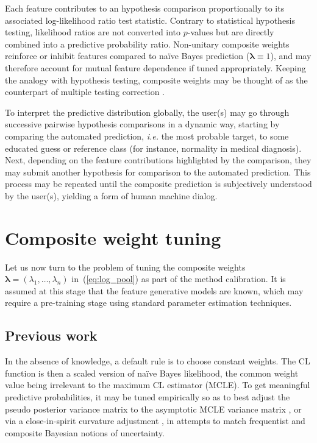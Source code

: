 \documentclass[english]{scrartcl}
\newcommand{\blambda}{{\boldsymbol{\lambda}}}
\begin{document}
Each feature contributes to an hypothesis comparison proportionally to its associated log-likelihood ratio test statistic. Contrary to statistical hypothesis testing, likelihood ratios are not converted into $p$-values but are directly combined into a predictive probability ratio. Non-unitary composite weights reinforce or inhibit features compared to na\"ive Bayes prediction ($\blambda\equiv 1$), and may therefore account for mutual feature dependence if tuned appropriately. Keeping the analogy with hypothesis testing, composite weights may be thought of as the counterpart of multiple testing correction \cite{Benjamini-10}.

To interpret the predictive distribution globally, the user(s) may go through successive pairwise hypothesis comparisons in a dynamic way, starting by comparing the automated prediction, {\em i.e.} the most probable target, to some educated guess or reference class (for instance, normality in medical diagnosis). Next, depending on the feature contributions highlighted by the comparison, they may submit another hypothesis for comparison to the automated prediction. This process may be repeated until the composite prediction is subjectively understood by the user(s), yielding a form of human machine dialog.



\section{Composite weight tuning}
\label{sec:tuning}


Let us now turn to the problem of tuning the composite weights~$\blambda=(\lambda_1,\ldots,\lambda_n)$ in~(\ref{eq:log_pool}) as part of the method calibration. It is assumed at this stage that the feature generative models are known, which may require a pre-training stage using standard parameter estimation techniques.


\subsection{Previous work}

In the absence of knowledge, a default rule is to choose constant weights. The CL function is then a scaled version of na\"ive Bayes likelihood, the common weight value being irrelevant to the maximum CL estimator (MCLE). To get meaningful predictive probabilities, it may be tuned empirically so as to best adjust the pseudo posterior variance matrix to the asymptotic MCLE variance matrix \cite{Pauli-11}, or via a close-in-spirit curvature adjustment \cite{Ribatet-12}, in attempts to match frequentist and composite Bayesian notions of uncertainty.
\end{document}
